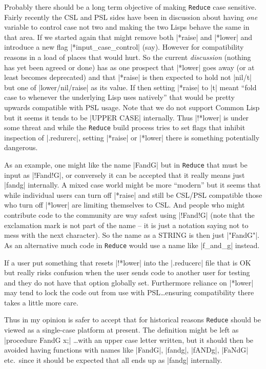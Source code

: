 \documentclass[12pt,twoside,openright]{memoir}
\newcommand{\reduce}{\texttt{Reduce}\xspace}
\begin{document}
Probably there should be a long term objective of making \reduce case
sensitive. Fairly recently the CSL and PSL sides have been in discussion about
having \emph{one} variable to control case not two and making the two Lisps
behave the same in that area. If we started again that might remove both
|*raise| and |*lower| and introduce a new flag |*input_case_control|
(say). However for compatibility reasons in a load of places that would
hurt. So the current \emph{discussion} (nothing has yet been agreed or done)
has as one prospect that |*lower| goes away (or at least becomes deprecated)
and that |*raise| is then expected to hold not |nil/t| but one of
|lower/nil/raise| as its value. If then setting |*raise| to |t| meant ``fold
case to whenever the underlying Lisp uses natively'' that would be pretty
upwards compatible with PSL usage. Note that we do not support Common
Lisp but it seems it tends to be |UPPER CASE| internally. Thus |!*lower|
is under some threat and while the \reduce build process tries to set flags
that inhibit inspection of |.redurerc|, setting |*raise| or |*lower|
there is something potentially dangerous.

As an example, one might like the name |FandG| but in \reduce that must be
input as |!Fand!G|, or conversely it can be accepted that it really
means just |fandg| internally. A mixed case world might be more ``modern''
but it seems that while individual users can turn off |*raise| and still
be CSL/PSL compatible those who turn off |*lower| are limiting themselves
to CSL. And people who might contribute code to the community are way safest
using |!Fand!G| (note that the exclamation mark is not part of the name -- it
is just a notation saying not to mess with the next character).
So the name as a STRING is then just |"FandG"|. As an alternative
much code in \reduce would use a name like |f_and_g| instead.

If a user put something that resets |!*lower| into the |.reducerc| file
that is OK but really risks confusion when the user sends code to another
user for testing and they do not have that option globally set.
Furthermore reliance on |*lower| may tend to lock the code out from use with
PSL\dots ensuring compatibility there takes a little more care.

Thus in my opinion is safer to accept that for historical reasons \reduce
should be viewed as a single-case platform at present. The definition might
be left as |procedure FandG x;| \dots with an upper case letter written,
but it should then be avoided having functions with names like
|FandG|, |fandg|, |fANDg|, |FaNdG| etc.\ since it should be expected that
all ends up as |fandg| internally.
\end{document}
